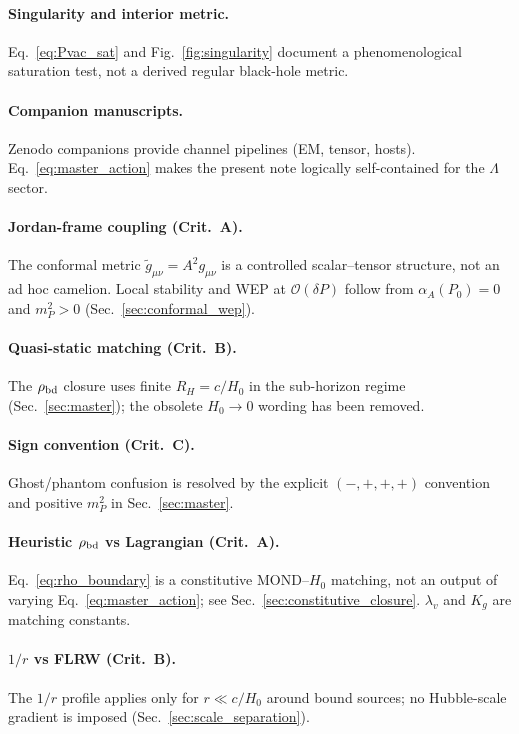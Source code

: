 \documentclass[prd,
               reprint,
               aps,
               preprintnumbers,
               nofootinbib,
               longbibliography,
               floatfix]{revtex4-2}
\begin{document}
\paragraph{Singularity and interior metric.}
Eq.~\eqref{eq:Pvac_sat} and Fig.~\ref{fig:singularity} document a
phenomenological saturation test, not a derived regular black-hole
metric.

\paragraph{Companion manuscripts.}
Zenodo companions provide channel pipelines (EM, tensor, hosts).
Eq.~\eqref{eq:master_action} makes the present note logically
self-contained for the $\Lambda$ sector.

\paragraph{Jordan-frame coupling (Crit.~A).}
The conformal metric $\tilde g_{\mu\nu}=A^2 g_{\mu\nu}$ is a controlled
scalar--tensor structure, not an ad hoc camelion.
Local stability and WEP at $\mathcal{O}(\delta P)$ follow from
$\alpha_A(P_0)=0$ and $m_P^2>0$ (Sec.~\ref{sec:conformal_wep}).

\paragraph{Quasi-static matching (Crit.~B).}
The $\rho_{\rm bd}$ closure uses finite $R_H=c/H_0$ in the
sub-horizon regime (Sec.~\ref{sec:master}); the obsolete
$H_0\to 0$ wording has been removed.

\paragraph{Sign convention (Crit.~C).}
Ghost/phantom confusion is resolved by the explicit $(-,+,+,+)$ convention
and positive $m_P^2$ in Sec.~\ref{sec:master}.

\paragraph{Heuristic $\rho_{\rm bd}$ vs Lagrangian (Crit.~A).}
Eq.~\eqref{eq:rho_boundary} is a constitutive MOND--$H_0$ matching,
not an output of varying Eq.~\eqref{eq:master_action}; see
Sec.~\ref{sec:constitutive_closure}. $\lambda_v$ and $K_g$ are matching
constants.

\paragraph{$1/r$ vs FLRW (Crit.~B).}
The $1/r$ profile applies only for $r\ll c/H_0$ around bound sources;
no Hubble-scale gradient is imposed (Sec.~\ref{sec:scale_separation}).
\end{document}
